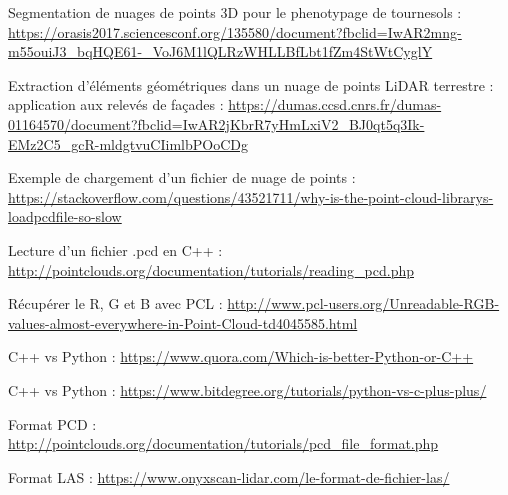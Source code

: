 \documentclass[12pt,titlepage,french]{article}
\newcounter{firstbib}
\begin{document}
\renewcommand{\refname}{C++}
\begin{thebibliography}{3}
\setcounter{enumiv}{\value{firstbib}}

 Segmentation de nuages de points 3D pour le phenotypage de tournesols :
\url{https://orasis2017.sciencesconf.org/135580/document?fbclid=IwAR2mng-m55ouiJ3_bqHQE61-_VoJ6M1lQLRzWHLLBfLbt1fZm4StWtCyglY}

 Extraction d'éléments géométriques dans un nuage de points LiDAR terrestre : application aux relevés de façades :
\url{https://dumas.ccsd.cnrs.fr/dumas-01164570/document?fbclid=IwAR2jKbrR7yHmLxiV2_BJ0qt5q3Ik-EMz2C5_gcR-mldgtvuCIimlbPOoCDg}

 Exemple de chargement d'un fichier de nuage de points :
\url{https://stackoverflow.com/questions/43521711/why-is-the-point-cloud-librarys-loadpcdfile-so-slow}

 Lecture d'un fichier .pcd en C++ :
\url{http://pointclouds.org/documentation/tutorials/reading_pcd.php}

 Récupérer le R, G et B avec PCL :
\url{http://www.pcl-users.org/Unreadable-RGB-values-almost-everywhere-in-Point-Cloud-td4045585.html}

\setcounter{firstbib}{\value{enumiv}}
\end{thebibliography}


\renewcommand{\refname}{Comparaison C++/Python}
\begin{thebibliography}{3}
\setcounter{enumiv}{\value{firstbib}}

 C++ vs Python :
\url{https://www.quora.com/Which-is-better-Python-or-C++}

 C++ vs Python :
\url{https://www.bitdegree.org/tutorials/python-vs-c-plus-plus/}

\setcounter{firstbib}{\value{enumiv}}
\end{thebibliography}


\renewcommand{\refname}{Formats de fichier}
\begin{thebibliography}{3}
\setcounter{enumiv}{\value{firstbib}}

 Format PCD :
\url{http://pointclouds.org/documentation/tutorials/pcd_file_format.php}

 Format LAS :
\url{https://www.onyxscan-lidar.com/le-format-de-fichier-las/ }

\setcounter{firstbib}{\value{enumiv}}
\end{thebibliography}
\end{document}
